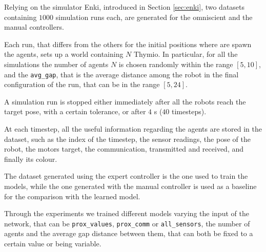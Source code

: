 Relying on the simulator Enki, introduced in Section \ref{sec:enki}, two datasets 
containing $1000$ simulation runs each, are generated for the omniscient and 
the manual controllers. 

Each run, that differs from the others for the initial positions where are spawn the 
agents, sets up a world containing $N$ Thymio. 
In particular, for all the simulations the number of agents $N$ is chosen randomly 
within the range $[5, 10]$, and the \texttt{avg\_gap}, that is the average distance 
among the robot in the final configuration of the run, that can be in the range 
$[5, 24]$.

A simulation run is stopped either immediately after all the robots reach the 
target pose, with a certain tolerance, or after $4$ \gls{s} ($40$ timesteps).

At each timestep, all the useful information regarding the agents are stored in the 
dataset, such as the index of the timestep, the sensor readings, the pose of the 
robot, the motors target, the communication, transmitted and received, and 
finally its colour.

The dataset generated using the expert controller is the one used to train the 
models, while the one generated with the manual controller is used as a baseline 
for the comparison with the learned model.

Through the experiments we trained different models varying the input of the 
network, that can be \texttt{prox\_values}, \texttt{prox\_comm} or 
\texttt{all\_sensors}, the number of agents and the average gap distance between 
them, that can both be fixed to a certain value or being variable.



